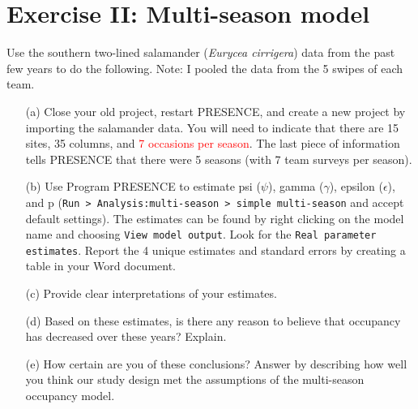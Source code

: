 \documentclass[12pt]{article}\usepackage[]{graphicx}\usepackage[]{color}
\begin{document}
\clearpage

\section*{Exercise II: Multi-season model}

Use the southern two-lined salamander ({\it Eurycea cirrigera})
data from the
past few years to do the following. Note: I pooled the data from
the 5 swipes of each team.   

\begin{enumerate}
  \item[(a)] Close your old project, restart PRESENCE, and create a
    new project by importing the salamander
    data. You will need to indicate that there are 15 sites, 35
    columns, and \textcolor{red}{7 occasions per season}. The last piece of
    information tells PRESENCE that there were 5 seasons (with 7 team
    surveys per season).  
  \item[(b)] Use Program PRESENCE to estimate psi ($\psi$), gamma
    ($\gamma$), epsilon ($\epsilon$),
    and p (\texttt{Run > Analysis:multi-season > simple multi-season}
    and accept default settings). The estimates can be found by right clicking on the
    model name and choosing \texttt{View model output}. Look for the 
    \texttt{Real parameter estimates}. Report the 4 unique
    estimates and standard errors by creating a table in your Word
    document.  
  \item[(c)] Provide clear interpretations of your estimates. 
  \item[(d)] Based on these estimates, is there any reason to believe
    that occupancy has decreased over these years? Explain. 
  \item[(e)] How certain are you of these conclusions? Answer by
    describing how well you think our study design met the assumptions
    of the multi-season occupancy model. 

\end{enumerate}







\end{document}
